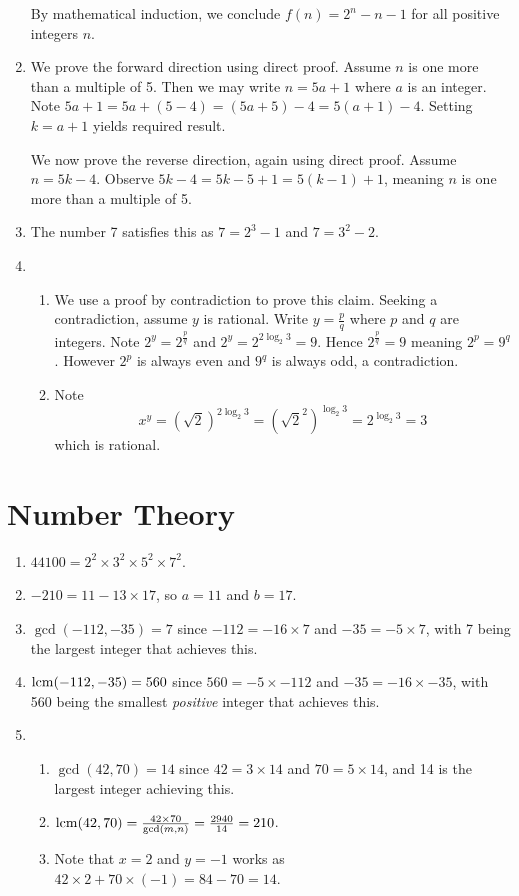 \begin{enumerate}
    By mathematical induction, we conclude $f(n) = 2^n - n - 1$ for all positive integers $n$.
    
    \item We prove the forward direction using direct proof. Assume $n$ is one more than a multiple of 5. Then we may write $n = 5a + 1$ where $a$ is an integer. Note $5a + 1 = 5a + (5 - 4) = (5a + 5) - 4 = 5(a+1) - 4$. Setting $k = a+1$ yields required result.
    
    We now prove the reverse direction, again using direct proof. Assume $n = 5k - 4$. Observe $5k - 4 = 5k - 5 + 1 = 5(k-1) + 1$, meaning $n$ is one more than a multiple of 5.
    
    \item The number 7 satisfies this as $7 = 2^3 - 1$ and $7 = 3^2 - 2$.
    
    \item \begin{enumerate}[label=(\roman*)]
        \item We use a proof by contradiction to prove this claim. Seeking a contradiction, assume $y$ is rational. Write $y = \frac pq$ where $p$ and $q$ are integers. Note $2^y = 2^{\frac pq}$ and $2^y = 2^{2\log_2{3}} = 9$. Hence $2^{\frac pq} = 9$ meaning $2^p = 9^q$. However $2^p$ is always even and $9^q$ is always odd, a contradiction.
        \item Note
        \[
            x^y = (\sqrt2)^{2\log_2{3}} = \left(\sqrt{2}^2\right)^{\log_2{3}} = 2^{\log_2{3}} = 3        
        \]
        which is rational.
    \end{enumerate}
\end{enumerate}

\section{Number Theory}
\begin{enumerate}
    \item $44100 = 2^2 \times 3^2 \times 5^2 \times 7^2$.
    \item $-210 = 11 - 13 \times 17$, so $a = 11$ and $b = 17$.
    \item $\gcd(-112, -35) = 7$ since $-112 = -16 \times 7$ and $-35 = -5 \times 7$, with 7 being the largest integer that achieves this.
    \item $\mathrm{lcm}(-112, -35) = 560$ since $560 = -5 \times -112$ and $-35 = -16 \times -35$, with 560 being the smallest \textit{positive} integer that achieves this.
    \item \begin{enumerate}[label=(\roman*)]
        \item $\gcd(42, 70) = 14$ since $42 = 3 \times 14$ and $70 = 5 \times 14$, and 14 is the largest integer achieving this.
        \item $\mathrm{lcm}(42, 70) = \frac{42 \times 70}{\gcd(m, n)} = \frac{2940}{14} = 210$.
        \item Note that $x = 2$ and $y = -1$ works as $42 \times 2 + 70 \times (-1) = 84 - 70 = 14$.
    \end{enumerate}
\end{enumerate}

